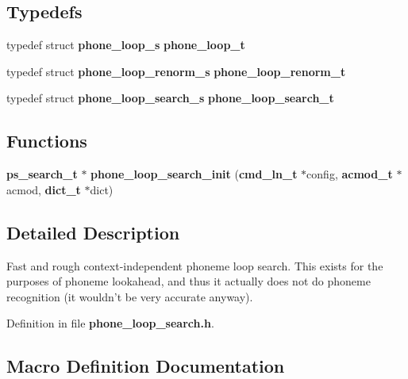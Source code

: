 \subsection*{Typedefs}
\begin{DoxyCompactItemize}
\item 
typedef struct {\bf phone\-\_\-loop\-\_\-s} {\bfseries phone\-\_\-loop\-\_\-t}\label{phone__loop__search_8h_a377517ed7dc87ca9ad683dad2182c036}

\item 
typedef struct {\bf phone\-\_\-loop\-\_\-renorm\-\_\-s} {\bfseries phone\-\_\-loop\-\_\-renorm\-\_\-t}\label{phone__loop__search_8h_a313734607dd312343fd138ccc32b9228}

\item 
typedef struct {\bf phone\-\_\-loop\-\_\-search\-\_\-s} {\bfseries phone\-\_\-loop\-\_\-search\-\_\-t}\label{phone__loop__search_8h_aff0f48051fd9e2725230896875887aa2}

\end{DoxyCompactItemize}
\subsection*{Functions}
\begin{DoxyCompactItemize}
\item 
{\bf ps\-\_\-search\-\_\-t} $\ast$ {\bfseries phone\-\_\-loop\-\_\-search\-\_\-init} ({\bf cmd\-\_\-ln\-\_\-t} $\ast$config, {\bf acmod\-\_\-t} $\ast$acmod, {\bf dict\-\_\-t} $\ast$dict)\label{phone__loop__search_8h_a2308707c1a22ea9b0495f6c7f151f806}

\end{DoxyCompactItemize}


\subsection{Detailed Description}
Fast and rough context-\/independent phoneme loop search. This exists for the purposes of phoneme lookahead, and thus it actually does not do phoneme recognition (it wouldn't be very accurate anyway). 

Definition in file {\bf phone\-\_\-loop\-\_\-search.\-h}.



\subsection{Macro Definition Documentation}
